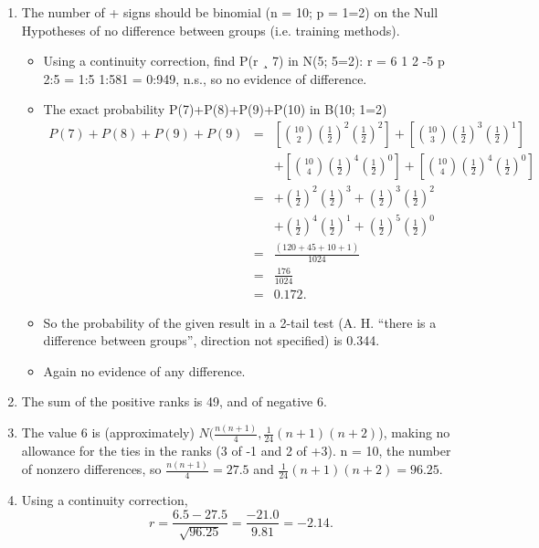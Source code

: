 \documentclass[a4paper,12pt]{article}
\begin{document}
\begin{enumerate}

\item  The number of + signs should be binomial (n = 10; p = 1=2) on the Null
Hypotheses of no difference between groups (i.e. training methods). 
\begin{itemize}
\item Using
a continuity correction, find P(r ¸ 7) in N(5; 5=2):
r = 6 1
2
-5
p
2:5
= 1:5
1:581 = 0:949, n.s., so no evidence of difference.
\item The exact probability P(7)+P(8)+P(9)+P(10) in B(10; 1=2)  
\begin{eqnarray*} 
P(7)+P(8)+P(9)+P(9) &=& 
\left[ { 10 \choose 2}
\left( \frac{1}{2} \right) ^2 \left(\frac{1}{2}\right)^2 \right]+ 
\left[ { 10 \choose 3}
\left( \frac{1}{2} \right) ^3  \left(\frac{1}{2}\right)^1 \right]\\
& & +\left[ { 10 \choose 4}
\left( \frac{1}{2} \right) ^4  \left(\frac{1}{2}\right)^{0} \right]
+\left[ { 10 \choose 4}
\left( \frac{1}{2} \right) ^4  \left(\frac{1}{2}\right)^{0} \right]
\\  &=& 
+ \left( \frac{1}{2} \right) ^2  \left(\frac{1}{2}\right)^{3}
+ \left( \frac{1}{2} \right) ^3  \left(\frac{1}{2}\right)^{2}\\
& & + \left( \frac{1}{2} \right) ^4  \left(\frac{1}{2}\right)^{1}
+ \left( \frac{1}{2} \right) ^5  \left(\frac{1}{2}\right)^{0} 
\\ &=&  \frac{(120 + 45 + 10 + 1)}{1024}    \\
 &=& \frac{176}{1024} \\
 &=& 0.172.
\end{eqnarray*}
\item So the
probability of the given result in a 2-tail test (A. H. “there is a difference
between groups”, direction not specified) is 0.344. 
\item  Again no evidence of any
difference.
\end{itemize}
\item  The sum of the positive ranks is 49, and of negative 6. 
\item The value 6 is
(approximately) $N( \frac{n(n+1)}{4} ,\frac{1}{24}(n + 1)(n + 2)$), making no allowance for
the ties in the ranks (3 of -1 and 2 of +3). n = 10, the number of nonzero
differences, so $\frac{n(n+1)}{4}  = 27.5 $
 and $\frac{1}{24}(n + 1)(n + 2) = 96.25$. 
 \item Using a
continuity correction, \[r = \frac{6.5-27.5}{\sqrt{96.25} }= \frac{-21.0}{9.81} = -2.14.\]

\end{enumerate}
\end{document}

